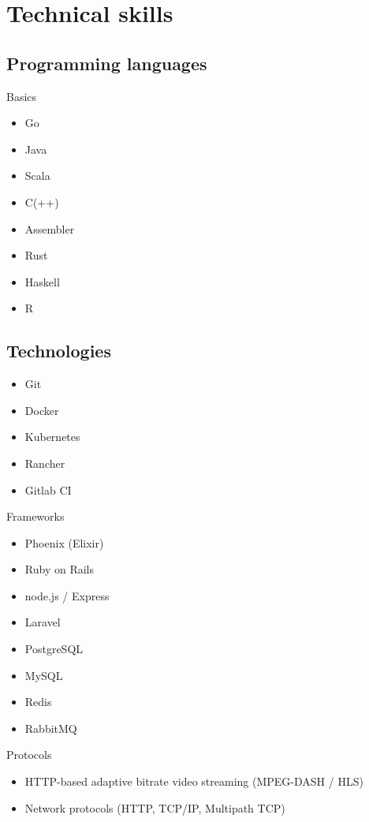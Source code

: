 \documentclass[11pt,a4paper,sans]{moderncv}        %
\begin{document}
\section{Technical skills}
\subsection{\textbf{Programming languages}}
\smallskip
{}
{Basics}{
\begin{itemize}
\item Go
\item Java
\item Scala
\item C(++)
\item Assembler
\item Rust
\item Haskell
\item R
\end{itemize}}
\subsection{\textbf{Technologies}}
\smallskip
{}
{
\begin{itemize}
\item Git
\item Docker
\item Kubernetes
\item Rancher
\item Gitlab CI
\end{itemize}
}
{Frameworks}
{
\begin{itemize}
\item Phoenix (Elixir)
\item Ruby on Rails
\item node.js / Express
\item Laravel
\end{itemize}
}

\medskip

{
\begin{itemize}
\item PostgreSQL
\item MySQL
\item Redis
\item RabbitMQ
\end{itemize}
}
{Protocols}
{
  \begin{itemize}
    \item HTTP-based adaptive bitrate video streaming (MPEG-DASH / HLS)
    \item Network protocols (HTTP, TCP/IP, Multipath TCP)
  \end{itemize}
}
\end{document}
